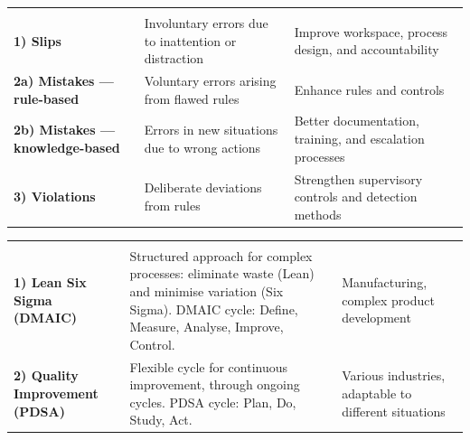 
\noindent\begin{minipage}{\textwidth}
\renewcommand{\arraystretch}{1.35}
\begin{tabularx}{\textwidth}{@{}L{0.24\textwidth}YL{0.32\textwidth}@{}}
  &  & \\
{\tabfont \textbf{1) Slips}} &
{\tabfont Involuntary errors due to inattention or distraction} &
{\tabfont Improve workspace, process design, and accountability}\\
{\tabfont \textbf{2a) Mistakes --- rule-based}} &
{\tabfont Voluntary errors arising from flawed rules} &
{\tabfont Enhance rules and controls}\\
{\tabfont \textbf{2b) Mistakes --- knowledge-based}} &
{\tabfont Errors in new situations due to wrong actions} &
{\tabfont Better documentation, training, and escalation processes}\\
{\tabfont \textbf{3) Violations}} &
{\tabfont Deliberate deviations from rules} &
{\tabfont Strengthen supervisory controls and detection methods}\\
\end{tabularx}
\end{minipage}


\noindent\begin{minipage}{\textwidth}
\renewcommand{\arraystretch}{1.35}
\begin{tabularx}{\textwidth}{@{}L{0.22\textwidth}YL{0.26\textwidth}@{}}
  &  & \\
{\tabfont \textbf{1) Lean Six Sigma (DMAIC)}} &
{\tabfont Structured approach for complex processes: eliminate waste (Lean) and
minimise variation (Six Sigma). DMAIC cycle: Define, Measure, Analyse, Improve,
Control.} &
{\tabfont Manufacturing, complex product development}\\
{\tabfont \textbf{2) Quality Improvement (PDSA)}} &
{\tabfont Flexible cycle for continuous improvement, through ongoing cycles.
PDSA cycle: Plan, Do, Study, Act.} &
{\tabfont Various industries, adaptable to different situations}\\
\end{tabularx}
\end{minipage}

